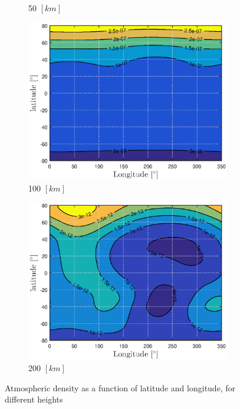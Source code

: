 \begin{figure}[h]
\begin{subfigure}{0.49\textwidth}
		\caption{50 $[km]$} 
		\label{fig:atmos_rho_50km}
	\end{subfigure}
	\begin{subfigure}{0.49\textwidth}
		\centering
		\includegraphics[width=0.98\textwidth]{Figure/Atmosphere/density_100km.eps}
		\caption{100 $[km]$} 
		\label{fig:atmos_rho_100km}
	\end{subfigure}
	\begin{subfigure}{0.49\textwidth}
		\centering
		\includegraphics[width=0.98\textwidth]{Figure/Atmosphere/density_200km.eps}
		\caption{200 $[km]$} 
		\label{fig:atmos_rho_200km}
	\end{subfigure}		
	\caption[Atmospheric density as a function of latitude and longitude]{Atmospheric density as a function of latitude and longitude, for different heights}
	\label{fig:atmos_density_heights}
\end{figure}
